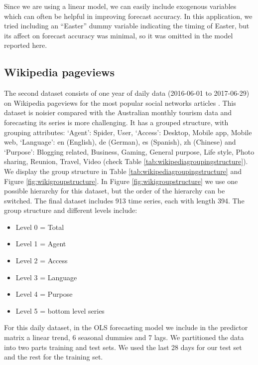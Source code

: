 \documentclass[11pt,a4paper,]{article}
\providecommand{\tightlist}{%
  \setlength{\itemsep}{0pt}\setlength{\parskip}{0pt}}
\begin{document}
Since we are using a linear model, we can easily include exogenous variables which can often be helpful in improving forecast accuracy. In this application, we tried including an ``Easter'' dummy variable indicating the timing of Easter, but its affect on forecast accuracy was minimal, so it was omitted in the model reported here.

\FloatBarrier

\hypertarget{wikipedia-pageviews}{%
\subsection{Wikipedia pageviews}\label{wikipedia-pageviews}}

The second dataset consists of one year of daily data (2016-06-01 to 2017-06-29) on Wikipedia pageviews for the most popular social networks articles \autocite{ashouri2018}. This dataset is noisier compared with the Australian monthly tourism data and forecasting its series is more challenging. It has a grouped structure, with grouping attributes: `Agent': Spider, User, `Access': Desktop, Mobile app, Mobile web, `Language': en (English), de (German), es (Spanish), zh (Chinese) and `Purpose': Blogging related, Business, Gaming, General purpose, Life style, Photo sharing, Reunion, Travel, Video (check Table \ref{tab:wikipediagroupingstructure}). We display the group structure in Table \ref{tab:wikipediagroupingstructure} and Figure \ref{fig:wikigroupstructure}. In Figure \ref{fig:wikigroupstructure} we use one possible hierarchy for this dataset, but the order of the hierarchy can be switched.
The final dataset includes 913 time series, each with length 394. The group structure and different levels include:

\begin{itemize}
\tightlist
\item
  Level 0 = Total
\item
  Level 1 = Agent
\item
  Level 2 = Access
\item
  Level 3 = Language
\item
  Level 4 = Purpose
\item
  Level 5 = bottom level series
\end{itemize}

For this daily dataset, in the OLS forecasting model we include in the predictor matrix a linear trend, 6 seasonal dummies and 7 lags. We partitioned the data into two parts training and test sets. We used the last 28 days for our test set and the rest for the training set.
\end{document}
